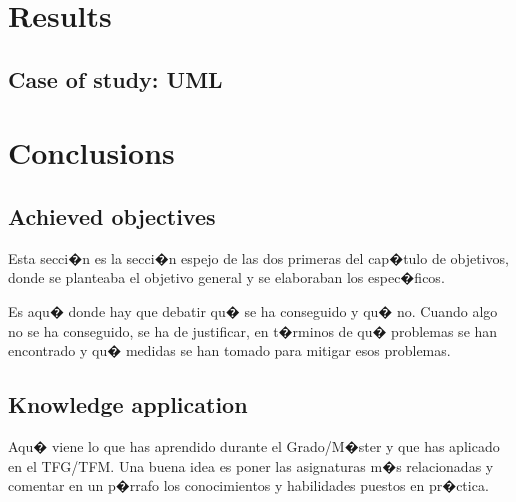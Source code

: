 \documentclass[a4paper, 12pt]{book}
\begin{document}

\cleardoublepage
\chapter{Results}

\section{Case of study: UML}
\label{sec:caso-estudio-uml}



\cleardoublepage
\chapter{Conclusions}
\label{chap:conclusiones}


\section{Achieved objectives}
\label{sec:consecucion-objetivos}

Esta secci�n es la secci�n espejo de las dos primeras del cap�tulo de objetivos,
donde se planteaba el objetivo general y se elaboraban los espec�ficos.

Es aqu� donde hay que debatir qu� se ha conseguido y qu� no. Cuando algo no
se ha conseguido, se ha de justificar, en t�rminos de qu� problemas se han
encontrado y qu� medidas se han tomado para mitigar esos problemas.


\section{Knowledge application}
\label{sec:aplicacion}

Aqu� viene lo que has aprendido durante el Grado/M�ster y que has aplicado
en el TFG/TFM. Una buena idea es poner las asignaturas m�s relacionadas y
comentar en un p�rrafo los conocimientos y habilidades puestos en pr�ctica.
\end{document}
